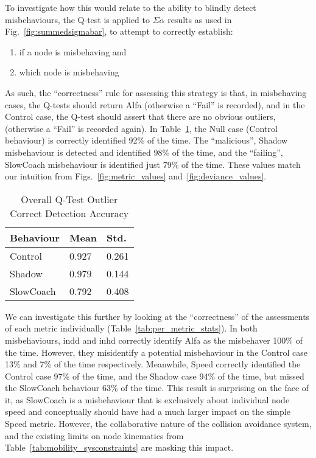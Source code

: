 To investigate how this would relate to the ability to blindly detect misbehaviours, the Q-test is applied to $\Sigma\alpha$ results as used in Fig.~\ref{fig:summedsigmabar}, to attempt to correctly establish:
\begin{enumerate}
  \item if a node is misbehaving and
  \item which node is misbehaving
\end{enumerate}

As such, the ``correctness'' rule for assessing this strategy is that, in misbehaving cases, the Q-tests should return Alfa (otherwise a ``Fail'' is recorded), and in the Control case, the Q-test should assert that there are no obvious outliers, (otherwise a ``Fail'' is recorded again).
In Table~\ref{tab:overall_stats}, the Null case (Control behaviour) is correctly identified 92\% of the time.
The ``malicious'', Shadow misbehaviour is detected and identified 98\% of the time, and the ``failing'', SlowCoach misbehaviour is identified just 79\% of the time. 
These values match our intuition from Figs.~\ref{fig:metric_values} and~\ref{fig:deviance_values}.

\begin{table}
  \caption{Overall Q-Test Outlier Correct Detection Accuracy}
  \centering
\begin{tabular}{lll}
\toprule
Behaviour &  Mean &   Std. \\
\midrule
Control   & 0.927 & 0.261 \\
Shadow    & 0.979 & 0.144 \\
SlowCoach & 0.792 & 0.408 \\
\bottomrule
\end{tabular}
  \label{tab:overall_stats}
\end{table}

We can investigate this further by looking at the ``correctness'' of the assessments of each metric individually (Table~\ref{tab:per_metric_stats}).
In both misbehaviours, \gls{indd} and \gls{inhd} correctly identify Alfa as the misbehaver 100\% of the time. 
However, they misidentify a potential misbehaviour in the Control case 13\% and 7\% of the time respectively.
Meanwhile, Speed correctly identified the Control case 97\% of the time, and the Shadow case 94\% of the time, but missed the SlowCoach behaviour 63\% of the time. 
This result is surprising on the face of it, as SlowCoach is a misbehaviour that is exclusively about individual node speed and conceptually should have had a much larger impact on the simple Speed metric.
However, the collaborative nature of the collision avoidance system, and the existing limits on node kinematics from Table~\ref{tab:mobility_sysconstraints} are masking this impact. 

